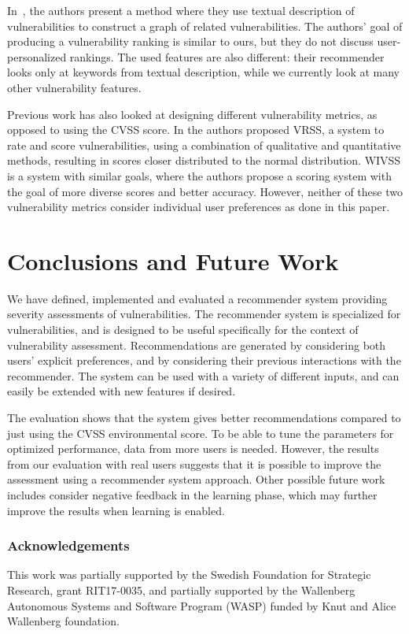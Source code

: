 {In~\cite{lee:2018}, the authors present a method where they use textual description of vulnerabilities to construct a graph of related vulnerabilities.
The authors' goal of producing a vulnerability ranking is similar to ours, but they do not discuss user-personalized rankings.
The used features are also different: their recommender looks only at keywords from textual description, while we currently look at many other vulnerability features.

Previous work has also looked at designing different vulnerability metrics, as opposed to using the CVSS score.
In \cite{liu:2011} the authors proposed VRSS, a system to rate and score vulnerabilities, using a combination of qualitative and quantitative methods, resulting in scores closer distributed to the normal distribution.
WIVSS \cite{spanos:2013} is a system with similar goals, where the authors propose a scoring system with the goal of more diverse scores and better accuracy.
However, neither of these two vulnerability metrics consider individual user preferences as done in this paper.



\section{Conclusions and Future Work} \label{sec:recsys:conclusions}
We have defined, implemented and evaluated a recommender system providing severity assessments of vulnerabilities.
The recommender system is specialized for vulnerabilities, and is designed to be useful specifically for the context of vulnerability assessment.
Recommendations are generated by considering both users' explicit preferences, and by considering their previous interactions with the recommender.
The system can be used with a variety of different inputs, and can easily be extended with new features if desired.

The evaluation shows that the system gives better recommendations compared to just using the CVSS environmental score. To be able to tune the parameters for optimized performance, data from more users is needed. However, the results from our evaluation with real users suggests that it is possible to improve the assessment using a recommender system approach. 
Other possible future work includes consider negative feedback in the learning phase, which may further improve the results when learning is enabled.

%
%
%

\subsubsection*{Acknowledgements}

This work was partially supported by the Swedish Foundation for Strategic Research, grant RIT17-0035, and partially supported by the Wallenberg Autonomous Systems and Software Program (WASP) funded by Knut and Alice Wallenberg foundation.

{\raggedright
	\printbibliography[segment=\therefsegment,heading=subbibliography]
}

}